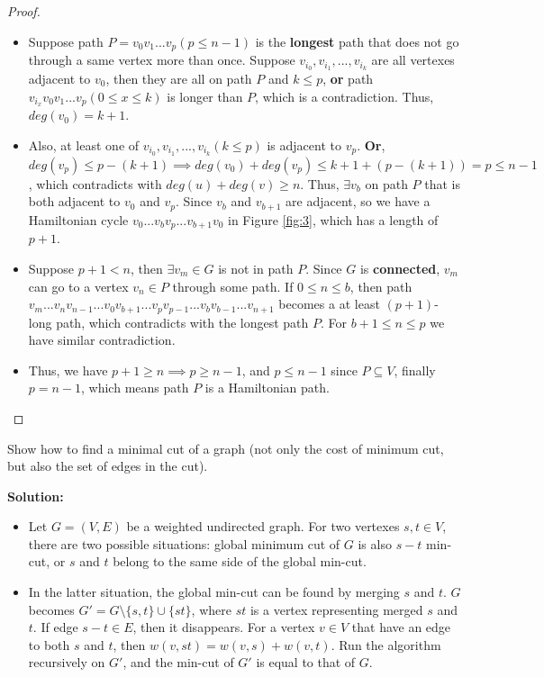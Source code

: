 \documentclass{article}
\newcounter{exercise}
\newcommand{\<}{
    \langle}
\renewcommand{\>}{
    \rangle}
\begin{document}
{\begin{proof}
\begin{itemize}
        \item Suppose path $P=v_0 v_1 ... v_p(p\leq n-1)$ is the \textbf{longest} path that does not go through a same vertex more than once. Suppose $v_{i_0},v_{i_1},...,v_{i_k}$ are all vertexes adjacent to $v_0$, then they are all on path $P$ and $k\leq p$, \textbf{or} path $v_{i_x}v_0v_1...v_p(0\leq x\leq k)$ is longer than $P$, which is a contradiction. Thus, $deg(v_0)=k+1$.
        
        \item Also, at least one of $v_{i_0},v_{i_1},...,v_{i_k} (k\leq p)$ is adjacent to $v_p$. \textbf{Or}, $deg(v_p)\leq p-(k+1)\implies deg(v_0)+deg(v_p)\leq k+1+(p-(k+1))=p\leq n-1$, which contradicts with $deg(u)+deg(v) \geq n$. Thus, $\exists v_b$ on path $P$ that is both adjacent to $v_0$ and $v_p$. Since $v_b$ and $v_{b+1}$ are adjacent, so we have a Hamiltonian cycle $v_0 ... v_b v_p ... v_{b+1} v_0$ in Figure \ref{fig:3}, which has a length of $p+1$.
        
        \item Suppose $p+1 < n$, then $\exists v_m \in G$ is not in path $P$. Since $G$ is \textbf{connected}, $v_m$ can go to a vertex $v_n\in P$ through some path. If $0\leq n\leq b$, then path $v_m ... v_n v_{n-1} ... v_0 v_{b+1} ... v_{p} v_{p-1} ... v_{b} v_{b-1} ... v_{n+1}$ becomes a at least $(p+1)$-long path, which contradicts with the longest path $P$. For $b+1\leq n\leq p$ we have similar contradiction. 
        \item Thus, we have $p+1 \geq n\implies p\geq n-1$, and $p \leq n-1$ since $P \subseteq V$, finally $p=n-1$, which means path $P$ is a Hamiltonian path.
    \end{itemize}
    
\end{proof}




\begin{exercise}
Show how to find a minimal cut of a graph (not only the cost of minimum cut, but also the set of edges in the cut).
\end{exercise}

\textbf{Solution:}

    \begin{itemize}
        \item Let $G=(V,E)$ be a weighted undirected graph. For two vertexes $s,t\in V$, there are two possible situations: global minimum cut of $G$ is also $s-t$ min-cut, or $s$ and $t$ belong to the same side of the global min-cut.
        \item In the latter situation, the global min-cut can be found by merging $s$ and $t$. $G$ becomes $G'=G\setminus \{s,t\}\cup \{st\}$, where $st$ is a vertex representing merged $s$ and $t$. If edge $s-t\in E$, then it disappears. For a vertex $v\in V$ that have an edge to both $s$ and $t$, then $w(v,st)=w(v,s)+w(v,t)$. Run the algorithm recursively on $G'$, and the min-cut of $G'$ is equal to that of $G$.
        

\end{itemize}}
\end{document}
